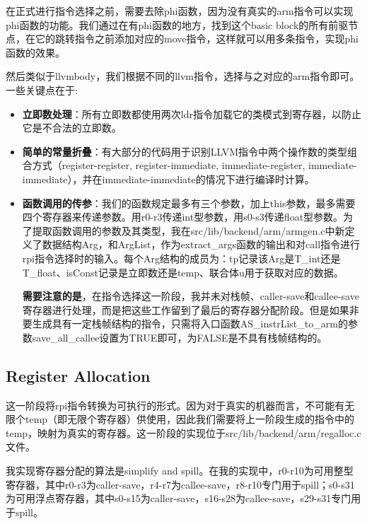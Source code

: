 \documentclass{article}
\begin{document}
在正式进行指令选择之前，需要去除phi函数，因为没有真实的arm指令可以实现phi函数的功能。我们通过在有phi函数的地方，找到这个basic block的所有前驱节点，在它的跳转指令之前添加对应的move指令，这样就可以用多条指令，实现phi函数的效果。

然后类似于llvmbody，我们根据不同的llvm指令，选择与之对应的arm指令即可。一些关键点在于:
\begin{itemize}
    \item \textbf{立即数处理}：所有立即数都使用两次ldr指令加载它的类模式到寄存器，以防止它是不合法的立即数。

    \item \textbf{简单的常量折叠}：有大部分的代码用于识别LLVM指令中两个操作数的类型组合方式（register-register, register-immediate, immediate-register, immediate-immediate），并在immediate-immediate的情况下进行编译时计算。

    \item \textbf{函数调用的传参}：我们的函数规定最多有三个参数，加上this参数，最多需要四个寄存器来传递参数。用r0-r3传递int型参数，用s0-s3传递float型参数。为了提取函数调用的参数及其类型，我在src/lib/backend/arm/armgen.c中新定义了数据结构Arg，和ArgList，作为extract\_args函数的输出和对call指令进行rpi指令选择时的输入。每个Arg结构的成员为：tp记录该Arg是T\_int还是T\_float、isConst记录是立即数还是temp、联合体u用于获取对应的数据。

\textbf{需要注意的是}，在指令选择这一阶段，我并未对栈帧、caller-save和callee-save寄存器进行处理，而是把这些工作留到了最后的寄存器分配阶段。但是如果非要生成具有一定栈帧结构的指令，只需将入口函数AS\_instrList\_to\_arm的参数save\_all\_callee设置为TRUE即可，为FALSE是不具有栈帧结构的。

\end{itemize}

\subsection{Register Allocation}
这一阶段将rpi指令转换为可执行的形式。因为对于真实的机器而言，不可能有无限个temp（即无限个寄存器）供使用，因此我们需要将上一阶段生成的指令中的temp，映射为真实的寄存器。这一阶段的实现位于src/lib/backend/arm/regalloc.c文件。

我实现寄存器分配的算法是simplify and spill。在我的实现中，r0-r10为可用整型寄存器，其中r0-r3为caller-save，r4-r7为callee-save，r8-r10专门用于spill；s0-s31为可用浮点寄存器，其中s0-s15为caller-save，s16-s28为callee-save，s29-s31专门用于spill。
\end{document}
